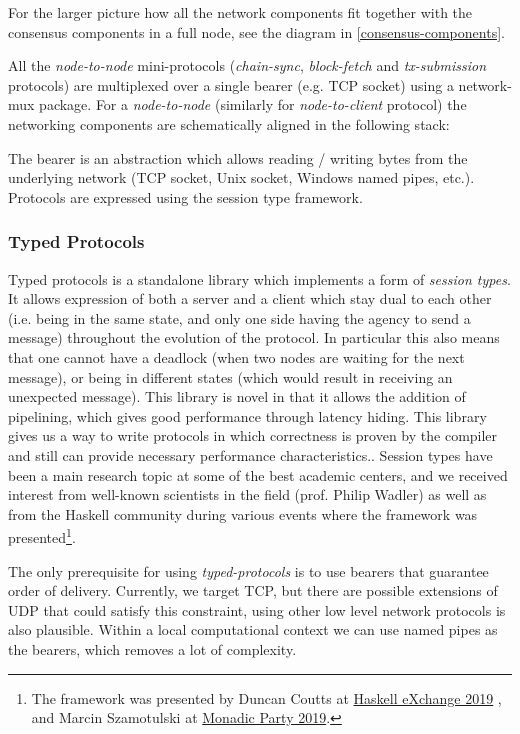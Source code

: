 \documentclass[11pt,a4paper]{article}
\begin{document}
For the larger picture how all the network components fit together with
the consensus components in a full node, see the diagram in
\cref{consensus-components}.

All the \emph{node-to-node} mini-protocols (\emph{chain-sync},
\emph{block-fetch} and \emph{tx-submission} protocols) are multiplexed
over a single bearer (e.g. TCP socket) using a network-mux package. For
a \emph{node-to-node} (similarly for \emph{node-to-client} protocol) the
networking components are schematically aligned in the following stack:

The bearer is an abstraction which allows reading / writing bytes from
the underlying network (TCP socket, Unix socket, Windows named pipes,
etc.). Protocols are expressed using the session type framework.

\subsubsection{Typed Protocols}
\label{typed-protocols}

Typed protocols is a standalone library which implements a form of
\emph{session types}. It allows expression of both a server and a
client which stay dual to each other (i.e. being in the same state, and
only one side having the agency to send a message) throughout the
evolution of the protocol. In particular this also means that one cannot
have a deadlock (when two nodes are waiting for the next message), or
being in different states (which would result in receiving an unexpected
message). This library is novel in that it allows the addition of
pipelining, which gives good performance through latency hiding. This
library gives us a way to write protocols in which correctness is proven
by the compiler and still can provide necessary performance
characteristics.. Session types have been a main research topic at some
of the best academic centers, and we received interest from well-known
scientists in the field (prof. Philip Wadler) as well as from the
Haskell community during various events where the framework was
presented\footnote{The framework was presented by Duncan Coutts at
  \href{https://skillsmatter.com/skillscasts/14633-45-minute-talk-by-duncan-coutts}{{Haskell
  eXchange 2019}} , and Marcin Szamotulski at
  \href{https://www.youtube.com/watch?v=j8gza2L61nM}{{Monadic Party
  2019}}.}.

The only prerequisite for using \emph{typed-protocols} is to use bearers
that guarantee order of delivery. Currently, we target TCP, but there
are possible extensions of UDP that could satisfy this constraint, using
other low level network protocols is also plausible. Within a local
computational context we can use named pipes as the bearers, which
removes a lot of complexity.
\end{document}
